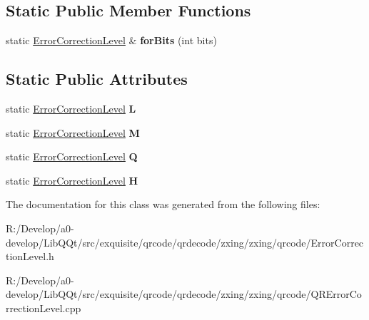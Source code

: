 \subsection*{Static Public Member Functions}
\begin{DoxyCompactItemize}
\item 
\mbox{\label{classzxing_1_1qrcode_1_1_error_correction_level_a18b9f5645916546a3103612a375ba364}} 
static \mbox{\hyperlink{classzxing_1_1qrcode_1_1_error_correction_level}{Error\+Correction\+Level}} \& {\bfseries for\+Bits} (int bits)
\end{DoxyCompactItemize}
\subsection*{Static Public Attributes}
\begin{DoxyCompactItemize}
\item 
\mbox{\label{classzxing_1_1qrcode_1_1_error_correction_level_a2d757885faddf2219e808a7a95f3ce8e}} 
static \mbox{\hyperlink{classzxing_1_1qrcode_1_1_error_correction_level}{Error\+Correction\+Level}} {\bfseries L}
\item 
\mbox{\label{classzxing_1_1qrcode_1_1_error_correction_level_ab061b3e5ee22c602a3d2bd061c08d6cc}} 
static \mbox{\hyperlink{classzxing_1_1qrcode_1_1_error_correction_level}{Error\+Correction\+Level}} {\bfseries M}
\item 
\mbox{\label{classzxing_1_1qrcode_1_1_error_correction_level_a8dfe5bbd3c55120910b5cd7d504c2282}} 
static \mbox{\hyperlink{classzxing_1_1qrcode_1_1_error_correction_level}{Error\+Correction\+Level}} {\bfseries Q}
\item 
\mbox{\label{classzxing_1_1qrcode_1_1_error_correction_level_a735588182a0f624990921a71394c7b6a}} 
static \mbox{\hyperlink{classzxing_1_1qrcode_1_1_error_correction_level}{Error\+Correction\+Level}} {\bfseries H}
\end{DoxyCompactItemize}


The documentation for this class was generated from the following files\+:\begin{DoxyCompactItemize}
\item 
R\+:/\+Develop/a0-\/develop/\+Lib\+Q\+Qt/src/exquisite/qrcode/qrdecode/zxing/zxing/qrcode/Error\+Correction\+Level.\+h\item 
R\+:/\+Develop/a0-\/develop/\+Lib\+Q\+Qt/src/exquisite/qrcode/qrdecode/zxing/zxing/qrcode/Q\+R\+Error\+Correction\+Level.\+cpp\end{DoxyCompactItemize}
